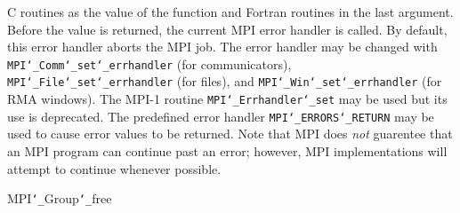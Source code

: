 C routines as the value of the function and Fortran routines in the last
argument.  Before the value is returned, the current MPI error handler is
called.  By default, this error handler aborts the MPI job.  The error handler
may be changed with {\tt MPI{\tt \char`\_}Comm{\tt \char`\_}set{\tt \char`\_}errhandler} (for communicators),
{\tt MPI{\tt \char`\_}File{\tt \char`\_}set{\tt \char`\_}errhandler} (for files), and {\tt MPI{\tt \char`\_}Win{\tt \char`\_}set{\tt \char`\_}errhandler} (for
RMA windows).  The MPI-1 routine {\tt MPI{\tt \char`\_}Errhandler{\tt \char`\_}set} may be used but
its use is deprecated.  The predefined error handler
{\tt MPI{\tt \char`\_}ERRORS{\tt \char`\_}RETURN} may be used to cause error values to be returned.
Note that MPI does {\em not} guarentee that an MPI program can continue past
an error; however, MPI implementations will attempt to continue whenever
possible.
\par
{}
\par
{}
 MPI{\tt \char`\_}Group{\tt \char`\_}free
\nextline
{}
\endmanpage
